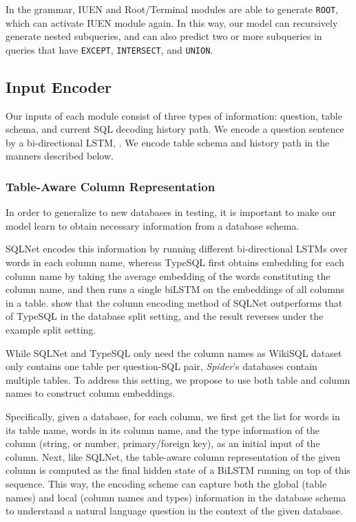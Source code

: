 \documentclass[11pt,a4paper]{article}
\begin{document}
In the grammar, IUEN and Root/Terminal modules are able to generate \texttt{ROOT}, which can activate IUEN module again.
In this way, our model can recursively generate nested subqueries, and can also predict two or more subqueries in queries that have \texttt{EXCEPT}, \texttt{INTERSECT}, and \texttt{UNION}.


\subsection{Input Encoder}

Our inputs of each module consist of three types of information: question, table schema, and current SQL decoding history path.
We encode a question sentence by a bi-directional LSTM, .
We encode table schema and history path in the manners described below. 

\subsubsection{Table-Aware Column Representation}
\label{sec:col_emb}
In order to generalize to new databases in testing, it is important to make our model learn to obtain necessary information from a database schema.

SQLNet \cite{Xu2017} encodes this information by running different bi-directional LSTMs over words in each column name, whereas TypeSQL \cite{Yu18} first obtains embedding for each column name by taking the average embedding of the words constituting the column name, and then runs a single biLSTM on the embeddings of all columns in a table. \citet{Yu&al.18.emnlp.corpus} show that the column encoding method of SQLNet outperforms that of TypeSQL in the database split setting, and the result reverses under the example split setting.

While SQLNet and TypeSQL only need the column names as WikiSQL dataset only contains one table per question-SQL pair, \textit{Spider}'s databases contain multiple tables.
To address this setting, we propose to use both table and column names to construct column embeddings. 

Specifically, given a database, for each column, we first get the list for words in its table name, words in its column name, and the type information of the column (string, or number, primary/foreign key), as an initial input of the column. 
Next, like SQLNet, the table-aware column representation of the given column is computed as the final hidden state of a BiLSTM running on top of this sequence. 
This way, the encoding scheme can capture both the global (table names) and local (column names and types) information in the database schema to understand a natural language question in the context of the given database.
\end{document}
